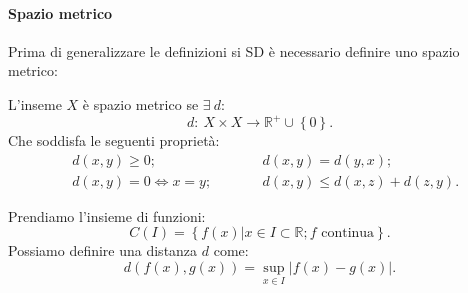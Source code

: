 \paragraph{Spazio metrico}%
\label{par:Spazio metrico}
Prima di generalizzare le definizioni si SD è necessario definire uno spazio metrico:
\begin{defn}
    L'inseme $X$ è spazio metrico se $\exists \ d:$ 
    \[
        d: \ X\times X \to \mathbb{R}^+ \cup \left\{0\right\}
    .\] 
    Che soddisfa le seguenti proprietà:
    \[\begin{aligned}
	& d(x, y) \ge 0; && \qquad d(x, y) = d(y, x); \\
	& d(x, y) = 0 \iff x = y; && \qquad d(x, y) \le d(x, z) + d(z, y)
    .\end{aligned}\]
\end{defn}
\noindent
\begin{exmp}
    Prendiamo l'insieme di funzioni:
    \[
	C(I) = \left\{f(x)| x \in I \subset \mathbb{R}; f \text{ continua}\right\}
    .\] 
    Possiamo definire una distanza $d$ come:
    \[
	d(f(x), g(x)) = \sup\limits_{x \in I}\left|f(x)- g(x)\right|
    .\] 
\end{exmp}
\noindent
